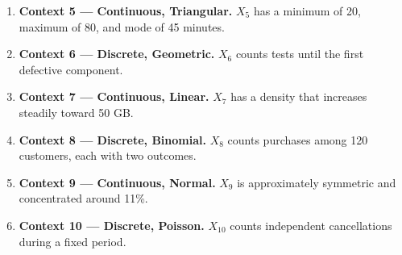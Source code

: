 {\begin{enumerate}
			\item \textbf{Context 5 — Continuous, Triangular.}
			\(X_5\) has a minimum of 20, maximum of 80, and mode of 45 minutes.
			
			\item \textbf{Context 6 — Discrete, Geometric.}
			\(X_6\) counts tests until the first defective component.
			
			\item \textbf{Context 7 — Continuous, Linear.}
			\(X_7\) has a density that increases steadily toward 50 GB.
			
			\item \textbf{Context 8 — Discrete, Binomial.}
			\(X_8\) counts purchases among 120 customers, each with two outcomes.
			
			\item \textbf{Context 9 — Continuous, Normal.}
			\(X_9\) is approximately symmetric and concentrated around 11\%.
			
			\item \textbf{Context 10 — Discrete, Poisson.}
			\(X_{10}\) counts independent cancellations during a fixed period.
			
		\end{enumerate}
		
		\vspace{-5mm}
		
	}
	
